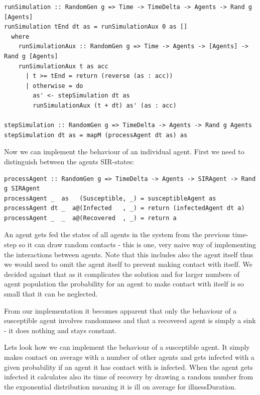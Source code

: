 \begin{verbatim}
runSimulation :: RandomGen g => Time -> TimeDelta -> Agents -> Rand g [Agents]
runSimulation tEnd dt as = runSimulationAux 0 as []
  where
    runSimulationAux :: RandomGen g => Time -> Agents -> [Agents] -> Rand g [Agents]
    runSimulationAux t as acc
      | t >= tEnd = return (reverse (as : acc))
      | otherwise = do
        as' <- stepSimulation dt as 
        runSimulationAux (t + dt) as' (as : acc)

stepSimulation :: RandomGen g => TimeDelta -> Agents -> Rand g Agents
stepSimulation dt as = mapM (processAgent dt as) as
\end{verbatim}

Now we can implement the behaviour of an individual agent. First we need to distinguish between the agents SIR-states:

\begin{verbatim}
processAgent :: RandomGen g => TimeDelta -> Agents -> SIRAgent -> Rand g SIRAgent
processAgent _  as   (Susceptible, _) = susceptibleAgent as
processAgent dt _  a@(Infected   , _) = return (infectedAgent dt a)
processAgent _  _  a@(Recovered  , _) = return a
\end{verbatim}

An agent gets fed the states of all agents in the system from the previous time-step so it can draw random contacts - this is one, very naive way of implementing the interactions between agents. Note that this includes also the agent itself thus we would need to omit the agent itself to prevent making contact with itself. We decided against that as it complicates the solution and for larger numbers of agent population the probability for an agent to make contact with itself is so small that it can be neglected.

From our implementation it becomes apparent that only the behaviour of a susceptible agent involves randomness and that a recovered agent is simply a sink - it does nothing and stays constant.

Lets look how we can implement the behaviour of a susceptible agent. It simply makes contact on average with a number of other agents and gets infected with a given probability if an agent it has contact with is infected.
When the agent gets infected it calculates also its time of recovery by drawing a random number from the exponential distribution meaning it is ill on average for illnessDuration.

